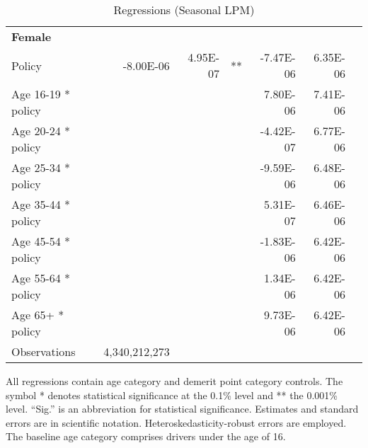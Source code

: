 \begin{table}
\begin{tabular}{l r r l r r l}
\hline 

\textbf{Female} \\ 

Policy             &  -8.00E-06        &  4.95E-07       &   **       &  -7.47E-06        &  6.35E-06       &            \\ 
Age 16-19 * policy           & & &  &  7.80E-06        &  7.41E-06       &            \\ 
Age 20-24 * policy           & & &  &  -4.42E-07        &  6.77E-06       &            \\ 
Age 25-34 * policy           & & &  &  -9.59E-06        &  6.48E-06       &            \\ 
Age 35-44 * policy           & & &  &  5.31E-07        &  6.46E-06       &            \\ 
Age 45-54 * policy           & & &  &  -1.83E-06        &  6.42E-06       &            \\ 
Age 55-64 * policy           & & &  &  1.34E-06        &  6.42E-06       &            \\ 
Age 65+ * policy           & & &  &  9.73E-06        &  6.42E-06       &            \\ 
Observations & 4,340,212,273 \\ 


\hline 

\end{tabular} 
\caption{Regressions (Seasonal LPM)} 
All regressions contain age category and demerit point category controls. 
The symbol * denotes statistical significance at the 0.1\% level 
and ** the 0.001\% level. 
``Sig.'' is an abbreviation for statistical significance. 
Estimates and standard errors are in scientific notation. 
Heteroskedasticity-robust errors are employed. 
The baseline age category comprises drivers under the age of 16. 
\label{tab:seas_regs} 
\end{table} 
 
